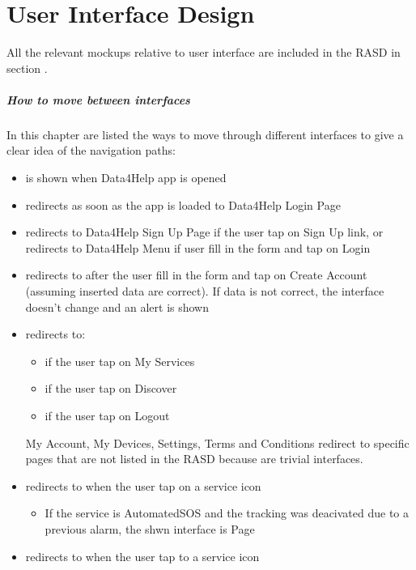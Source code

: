 \documentclass[../DD.tex]{subfiles}
\begin{document}
 \chapter{User Interface Design}
	All the relevant mockups relative to user interface are included in the RASD in section .
	\paragraph{How to move between interfaces}
	In this chapter are listed the ways to move through different interfaces to give a clear idea of the navigation paths:
	\begin{itemize}
		\item{ is shown when Data4Help app is opened}
		\item{ redirects as soon as the app is loaded to Data4Help Login Page}
		\item{ redirects to Data4Help Sign Up Page if the user tap on Sign Up link, or redirects to Data4Help Menu if user fill in the form and tap on Login}
		\item{ redirects to  after the user fill in the form and tap on Create Account (assuming inserted data are correct). If data is not correct, the interface doesn't change and an alert is shown}
		\item{ redirects to:}
			\begin{itemize}
				\item{ if the user tap on My Services}
				\item{ if the user tap on Discover}
				\item{ if the user tap on Logout}				
			\end{itemize}
			My Account, My Devices, Settings, Terms and Conditions redirect to specific pages that are not listed in the RASD because are trivial interfaces. 
		\item{ redirects to  when the user tap on a service icon}
			\begin{itemize}
				\item{If the service is AutomatedSOS and the tracking was deacivated due to a previous alarm, the shwn interface is  Page}
			\end{itemize}
		\item{ redirects to  when the user tap to a service icon}

\end{itemize}
\end{document}
